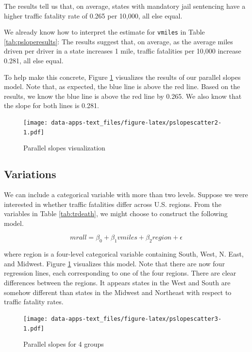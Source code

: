 \documentclass[
]{book}
\begin{document}
The results tell us that, on average, states with mandatory jail sentencing have a higher traffic fatality rate of 0.265 per 10,000, all else equal.

We already know how to interpret the estimate for \texttt{vmiles} in Table \ref{tab:psloperesults}: The results suggest that, on average, as the average miles driven per driver in a state increases 1 mile, traffic fatalities per 10,000 increase 0.281, all else equal.

To help make this concrete, Figure \ref{fig:pslopescatter2} visualizes the results of our parallel slopes model. Note that, as expected, the blue line is above the red line. Based on the results, we know the blue line is above the red line by 0.265. We also know that the slope for both lines is 0.281.

\begin{figure}
\centering
\texttt{[image: data-apps-text\_files/figure-latex/pslopescatter2-1.pdf]}
\caption{\label{fig:pslopescatter2}Parallel slopes visualization}
\end{figure}

\hypertarget{variations}{%
\subsection{Variations}\label{variations}}

We can include a categorical variable with more than two levels. Suppose we were interested in whether traffic fatalities differ across U.S. regions. From the variables in Table \ref{tab:trdeath}, we might choose to construct the following model.

\begin{equation}
mrall = \beta_0 + \beta_1vmiles + \beta_2region + \epsilon
\label{eq:pslopeexamp2}
\end{equation}

where region is a four-level categorical variable containing South, West, N. East, and Midwest. Figure \ref{fig:pslopescatter2} visualizes this model. Note that there are now four regression lines, each corresponding to one of the four regions. There are clear differences between the regions. It appears states in the West and South are somehow different than states in the Midwest and Northeast with respect to traffic fatality rates.

\begin{figure}
\centering
\texttt{[image: data-apps-text\_files/figure-latex/pslopescatter3-1.pdf]}
\caption{\label{fig:pslopescatter3}Parallel slopes for 4 groups}
\end{figure}
\end{document}
